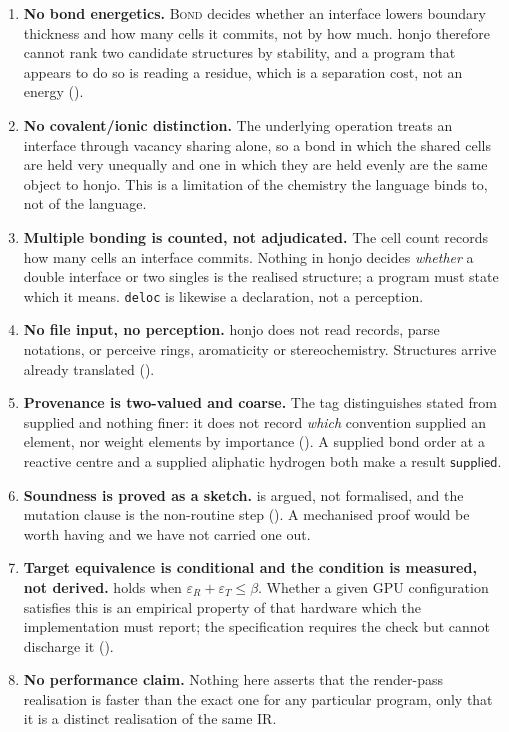 \documentclass[11pt,twocolumn,a4paper]{article}
\theoremstyle{thmstyle}
\theoremstyle{definition}
\theoremstyle{remark}
\newcommand{\flo}{\beta}
\newcommand{\hj}[1]{\texttt{#1}}
\newcommand{\supplied}{\textsf{supplied}}
\newcommand{\eps}{\varepsilon}
\begin{document}
\begin{enumerate}[label=\textbf{L\arabic*.},leftmargin=2.8em,itemsep=4pt]

\item \textbf{No bond energetics.} \textsc{Bond} decides whether an
interface lowers boundary thickness and how many cells it commits, not by
how much. honjo therefore cannot rank two candidate structures by
stability, and a program that appears to do so is reading a residue,
which is a separation cost, not an energy
().

\item \textbf{No covalent/ionic distinction.} The underlying operation
treats an interface through vacancy sharing alone, so a bond in which the
shared cells are held very unequally and one in which they are held
evenly are the same object to honjo. This is a limitation of the
chemistry the language binds to, not of the language.

\item \textbf{Multiple bonding is counted, not adjudicated.} The cell
count records how many cells an interface commits. Nothing in honjo
decides \emph{whether} a double interface or two singles is the realised
structure; a program must state which it means. \hj{deloc} is likewise a
declaration, not a perception.

\item \textbf{No file input, no perception.} honjo does not read
records, parse notations, or perceive rings, aromaticity or
stereochemistry. Structures arrive already translated
().

\item \textbf{Provenance is two-valued and coarse.} The tag distinguishes
stated from supplied and nothing finer: it does not record \emph{which}
convention supplied an element, nor weight elements by importance
(). A supplied bond order at a reactive centre
and a supplied aliphatic hydrogen both make a result $\supplied$.

\item \textbf{Soundness is proved as a sketch.}  is
argued, not formalised, and the mutation clause is the non-routine step
(). A mechanised proof would be worth having and we have
not carried one out.

\item \textbf{Target equivalence is conditional and the condition is
measured, not derived.}  holds when
$\eps_R+\eps_T\le\flo$. Whether a given GPU configuration satisfies this
is an empirical property of that hardware which the implementation must
report; the specification requires the check but cannot discharge it
().

\item \textbf{No performance claim.} Nothing here asserts that the
render-pass realisation is faster than the exact one for any particular
program, only that it is a distinct realisation of the same IR.
\end{enumerate}
\end{document}
